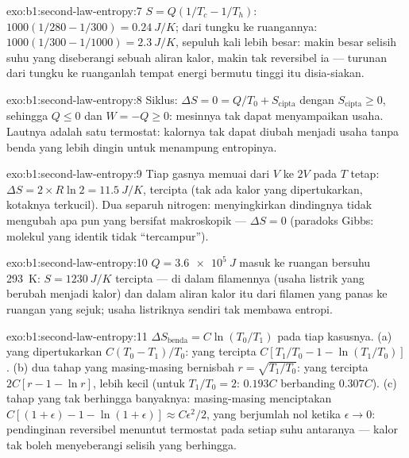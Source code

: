 \begin{solution}{exo:b1:second-law-entropy:7}
$S = Q(1/T_c - 1/T_h)$: $1000(1/280 - 1/300) = \qty{0.24}{J/K}$; dari tungku ke
ruangannya: $1000(1/300 - 1/1000) = \qty{2.3}{J/K}$, sepuluh kali lebih besar: makin besar
selisih suhu yang diseberangi sebuah aliran kalor, makin tak reversibel ia ---
turunan dari tungku ke ruanganlah tempat energi bermutu tinggi itu disia-siakan.
\end{solution}

\begin{solution}{exo:b1:second-law-entropy:8}
Siklus: $\Delta S = 0 = Q/T_0 + S_{\mathrm{cipta}}$ dengan $S_{\mathrm{cipta}} \geq 0$,
sehingga $Q \leq 0$ dan $W = -Q \geq 0$: mesinnya tak dapat menyampaikan usaha.
Lautnya adalah satu termostat: kalornya tak dapat diubah menjadi usaha tanpa
benda yang lebih dingin untuk menampung entropinya.
\end{solution}

\begin{solution}{exo:b1:second-law-entropy:9}
Tiap gasnya memuai dari $V$ ke $2V$ pada $T$ tetap: $\Delta S = 2 \times R\ln2
= \qty{11.5}{J/K}$, tercipta (tak ada kalor yang dipertukarkan, kotaknya terkucil). Dua
separuh nitrogen: menyingkirkan dindingnya tidak mengubah apa pun yang bersifat makroskopik ---
$\Delta S = 0$ (paradoks Gibbs: molekul yang identik tidak ``tercampur'').
\end{solution}

\begin{solution}{exo:b1:second-law-entropy:10}
$Q = \qty{3.6e5}{J}$ masuk ke ruangan bersuhu \qty{293}{K}: $S = \qty{1230}{J/K}$
tercipta --- di dalam filamennya (usaha listrik yang berubah menjadi kalor) dan dalam
aliran kalor itu dari filamen yang panas ke ruangan yang sejuk; usaha
listriknya sendiri tak membawa entropi.
\end{solution}

\begin{solution}{exo:b1:second-law-entropy:11}
$\Delta S_{\text{benda}} = C\ln(T_0/T_1)$ pada tiap kasusnya. (a) yang dipertukarkan
$C(T_0 - T_1)/T_0$: yang tercipta $C[T_1/T_0 - 1 - \ln(T_1/T_0)]$. (b) dua tahap
yang masing-masing bernisbah $r = \sqrt{T_1/T_0}$: yang tercipta $2C[r - 1 - \ln r]$, lebih kecil
(untuk $T_1/T_0 = 2$: $0.193C$ berbanding $0.307C$). (c) tahap yang tak berhingga banyaknya:
masing-masing menciptakan $C[(1 + \epsilon) - 1 - \ln(1 + \epsilon)] \approx C\epsilon^2/2$,
yang berjumlah nol ketika $\epsilon \to 0$: pendinginan reversibel menuntut termostat
pada setiap suhu antaranya --- kalor tak boleh menyeberangi selisih yang berhingga.
\end{solution}


